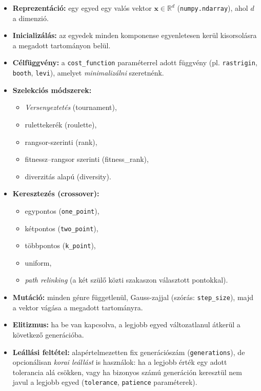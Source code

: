 \documentclass[a4paper,12pt]{article}
\begin{document}
\begin{itemize}
  \item \textbf{Reprezentáció:} egy egyed egy valós vektor
        $\mathbf x \in \mathbb{R}^d$ (\texttt{numpy.ndarray}), ahol $d$ a dimenzió.
  \item \textbf{Inicializálás:} az egyedek minden komponense egyenletesen
        kerül kisorsolásra a megadott tartományon belül.
  \item \textbf{Célfüggvény:} a \texttt{cost\_function} paraméterrel adott
        függvény (pl. \texttt{rastrigin}, \texttt{booth}, \texttt{levi}),
        amelyet \emph{minimalizálni} szeretnénk.
  \item \textbf{Szelekciós módszerek:}
    \begin{itemize}
      \item \emph{Versenyeztetés} (tournament),
      \item rulettekerék (roulette),
      \item rangsor-szerinti (rank),
      \item fitnessz–rangsor szerinti (fitness\_rank),
      \item diverzitás alapú (diversity).
    \end{itemize}
  \item \textbf{Keresztezés (crossover):}
    \begin{itemize}
      \item egypontos (\texttt{one\_point}),
      \item kétpontos (\texttt{two\_point}),
      \item többpontos (\texttt{k\_point}),
      \item uniform,
      \item \emph{path relinking} (a két szülő közti szakaszon választott
            pontokkal).
    \end{itemize}
  \item \textbf{Mutáció:} minden génre függetlenül, Gauss-zajjal
        (szórás: \texttt{step\_size}), majd a vektor vágása
        a megadott tartományra.
  \item \textbf{Elitizmus:} ha be van kapcsolva, a legjobb egyed
        változatlanul átkerül a következő generációba.
  \item \textbf{Leállási feltétel:} alapértelmezetten fix generációszám
        (\texttt{generations}), de opcionálisan
        \emph{korai leállást} is használok:
        ha a legjobb érték egy adott tolerancia alá csökken, vagy
        ha bizonyos számú generáción keresztül nem javul a legjobb egyed
        (\texttt{tolerance}, \texttt{patience} paraméterek).
\end{itemize}
\end{document}
